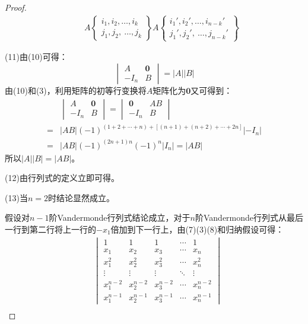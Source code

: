 \begin{proof}
\begin{align*}
		&\quad A\left\{ \begin{array}{l}
			i_1,i_2,\dots,i_k \\
			j_1,j_2,\ \dots,j_k
		\end{array} \right\}A\left\{ \begin{array}{l}
			i_1',i_2',\dots,i_{n-k}' \\
			j_1',j_2',\ \dots,j_{n-k}'
		\end{array} \right\}
	\end{align*}\par
	(11)由(10)可得：
	\begin{equation*}
		\begin{vmatrix}
			A & \mathbf{0} \\
			-I_n & B
		\end{vmatrix}=|A||B|
	\end{equation*}
	由(10)和(3)，利用矩阵的初等行变换将$A$矩阵化为$\mathbf{0}$又可得到：
	\begin{align*}
		&\begin{vmatrix}
			A & \mathbf{0} \\
			-I_n & B
		\end{vmatrix}=
		\begin{vmatrix}
		\mathbf{0} & AB \\
		-I_n & B
		\end{vmatrix} \\
		=&|AB|(-1)^{(1+2+\cdots+n)+[(n+1)+(n+2)+\cdots+2n]}|-I_n| \\
		=&|AB|(-1)^{(2n+1)n}(-1)^n|I_n|=|AB|
	\end{align*}
	所以$|A||B|=|AB|$。\par
	(12)由行列式的定义立即可得。\par
	(13)当$n=2$时结论显然成立。\par
	假设对$n-1$阶Vandermonde行列式结论成立，对于$n$阶Vandermonde行列式从最后一行到第二行将上一行的$-x_1$倍加到下一行上，由(7)(3)(8)和归纳假设可得：
	\begin{align*}
		&
		\begin{vmatrix}
			1 & 1 & 1 & \cdots & 1 \\
			x_1 & x_2 & x_3 & \cdots & x_n \\
			x_1^2 & x_2^2 & x_3^2 & \cdots & x_n^2 \\
			\vdots & \vdots & \vdots & \ddots & \vdots \\
			x_1^{n-2} & x_2^{n-2} & x_3^{n-2} & \cdots & x_n^{n-2} \\
			x_1^{n-1} & x_2^{n-1} & x_3^{n-1} & \cdots & x_n^{n-1}
		\end{vmatrix} \\

\end{align*}
\end{proof}
